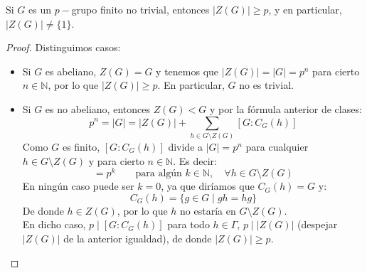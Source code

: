 \begin{teo}[de Burnside]
    Si $G$ es un $p-$grupo finito no trivial, entonces \newline $|Z(G)| \geq p$, y en particular, $|Z(G)| \neq \{1\}$.
    \begin{proof}
        Distinguimos casos:
        \begin{itemize}
            \item Si $G$ es abeliano, $Z(G) = G$ y tenemos que $|Z(G)| = |G| = p^n$ para cierto $n\in \mathbb{N}$, por lo que $|Z(G)| \geq p$. En particular, $G$ no es trivial.
            \item Si $G$ es no abeliano, entonces $Z(G) < G$ y por la fórmula anterior de clases:
                \begin{equation*}
                    p^n = |G| = |Z(G)| + \sum_{h\in G\setminus Z(G)} [G:C_G(h)]
                \end{equation*}
                Como $G$ es finito, $[G:C_G(h)]$ divide a $|G| = p^n$ para cualquier $h\in G\setminus Z(G)$ y para cierto $n\in \mathbb{N}$. Es decir:
                \begin{equation*}
                    [G:C_G(h)] = p^k \qquad \text{para algún\ } k\in \mathbb{N}, \quad \forall h\in G\setminus Z(G)
                \end{equation*}
                En ningún caso puede ser $k = 0$, ya que diríamos que $C_G(h) = G$ y:
                \begin{equation*}
                    C_G(h) = \{g\in G \mid gh=hg\}
                \end{equation*}
                De donde $h\in Z(G)$, por lo que $h$ no estaría en $G\setminus Z(G)$.\\

                \noindent
                En dicho caso, $p\mid [G:C_G(h)]$ para todo $h\in \Gamma$, $p\mid |Z(G)|$ (despejar $|Z(G)|$ de la anterior igualdad), de donde $|Z(G)| \geq p$.
        \end{itemize}
    \end{proof}
\end{teo}

